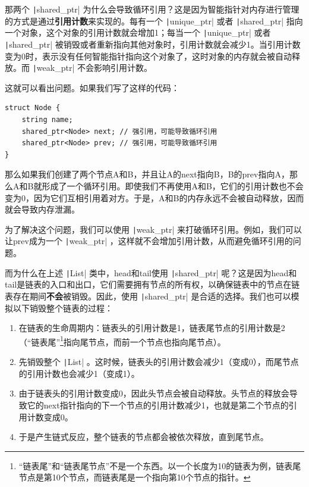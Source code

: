 \begin{note}
    那两个 \texttt|shared_ptr| 为什么会导致循环引用？这是因为智能指针对内存进行管理的方式是通过\textbf{引用计数}来实现的。每有一个 \texttt|unique_ptr| 或者 \texttt|shared_ptr| 指向一个对象，这个对象的引用计数就会增加1；每当一个 \texttt|unique_ptr| 或者 \texttt|shared_ptr| 被销毁或者重新指向其他对象时，引用计数就会减少1。当引用计数变为0时，表示没有任何智能指针指向这个对象了，这时对象的内存就会被自动释放。而 \texttt|weak_ptr| 不会影响引用计数。

    这就可以看出问题。如果我们写了这样的代码：
\begin{verbatim}
struct Node {
    string name;
    shared_ptr<Node> next; // 强引用，可能导致循环引用
    shared_ptr<Node> prev; // 强引用，可能导致循环引用
}
\end{verbatim}
    那么如果我们创建了两个节点A和B，并且让A的next指向B，B的prev指向A，那么A和B就形成了一个循环引用。即使我们不再使用A和B，它们的引用计数也不会变为0，因为它们互相引用着对方。于是，A和B的内存永远不会被自动释放，因而就会导致内存泄漏。

    为了解决这个问题，我们可以使用 \texttt|weak_ptr| 来打破循环引用。例如，我们可以让prev成为一个 \texttt|weak_ptr| ，这样就不会增加引用计数，从而避免循环引用的问题。

    而为什么在上述 \texttt|List| 类中，head和tail使用 \texttt|shared_ptr| 呢？这是因为head和tail是链表的入口和出口，它们需要拥有节点的所有权，以确保链表中的节点在链表存在期间\textbf{不会}被销毁。因此，使用 \texttt|shared_ptr| 是合适的选择。我们也可以模拟以下销毁整个链表的过程：
    \begin{enumerate}
        \item 在链表的生命周期内：链表头的引用计数是1，链表尾节点的引用计数是2（“链表尾”\footnote{“链表尾”和“链表尾节点”不是一个东西。以一个长度为10的链表为例，链表尾节点是第10个节点，而链表尾是一个指向第10个节点的指针。}指向尾节点，而前一个节点也指向尾节点）。
        \item 先销毁整个 \texttt|List| 。这时候，链表头的引用计数会减少1（变成0），而尾节点的引用计数也会减少1（变成1）。
        \item 由于链表头的引用计数变成0，因此头节点会被自动释放。头节点的释放会导致它的next指针指向的下一个节点的引用计数减少1，也就是第二个节点的引用计数变成0。
        \item 于是产生链式反应，整个链表的节点都会被依次释放，直到尾节点。
    \end{enumerate}
\end{note}

